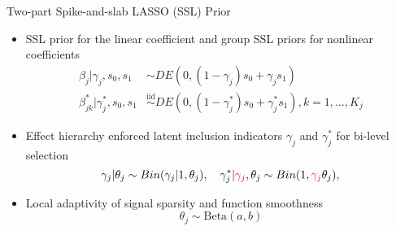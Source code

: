 \documentclass[
  ignorenonframetext,
  aspectratio=169]{beamer}
\providecommand{\tightlist}{%
  \setlength{\itemsep}{0pt}\setlength{\parskip}{0pt}}
\newcommand{\tp}{*}
\newcommand{\simiid}{\overset{\text{iid}}{\sim}}
\newcommand{\bg}[1]{\textcolor{red}{#1}}
\begin{document}
\begin{frame}{Two-part Spike-and-slab LASSO (SSL) Prior}
\protect\hypertarget{two-part-spike-and-slab-lasso-ssl-prior}{}
\begin{itemize}
\tightlist
\item
  SSL prior for the linear coefficient and group SSL priors for
  nonlinear coefficients \begin{align*}
  \beta_{j} |\gamma_{j},s_0,s_1 &\sim DE(0,(1-\gamma_{j}) s_0 + \gamma_{j} s_1) \\
  \beta^\tp_{jk} | \gamma^\tp_{j},s_0,s_1 &\simiid DE(0,(1-\gamma^\tp_{j}) s_0 + \gamma^\tp_{j} s_1), k = 1, \dots, K_j
  \end{align*}
\item
  Effect hierarchy enforced latent inclusion indicators \(\gamma_j\) and
  \(\gamma^\tp_{j}\) for bi-level selection \[
  \gamma_{j} | \theta_j \sim Bin(\gamma_{j}|1, \theta_j),\quad
  \gamma_{j}^\tp | \bg{\gamma_{j}}, \theta_j \sim Bin(1, \bg{\gamma_{j}}\theta_j),
  \]
\item
  Local adaptivity of signal sparsity and function smoothness \[
  \theta_j \sim \text{Beta}(a,b)
  \]
\end{itemize}
\end{frame}
\end{document}
